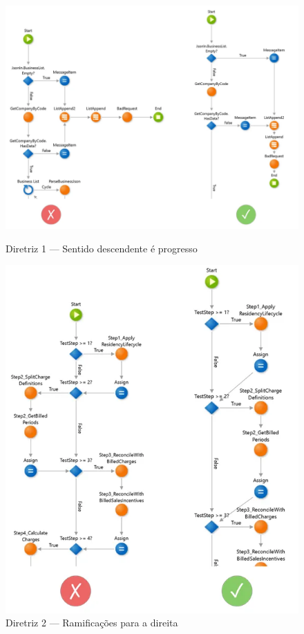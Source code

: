     \begin{figure}[H]
        \centering
        \begin{minipage}{.5\textwidth}
            \centering
            \includegraphics[scale=0.35]{imgs/diretrizes/1.png}
            \caption{Diretriz 1 — Sentido descendente é progresso}\label{fig:diretriz1}
        \end{minipage}%
        \begin{minipage}{.5\textwidth}
            \centering
            \includegraphics[scale=0.40]{imgs/diretrizes/2.png}
            \caption{Diretriz 2 — Ramificações para a direita}\label{fig:diretriz2}
        \end{minipage}
    \end{figure}

